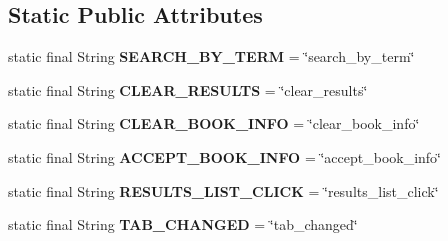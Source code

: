 \subsection*{Static Public Attributes}
\begin{DoxyCompactItemize}
\item 
\hypertarget{classw3se_1_1_controller_1_1_book_search_controller_aead80d147151577ca35c9c324ebc4f62}{static final String {\bfseries S\-E\-A\-R\-C\-H\-\_\-\-B\-Y\-\_\-\-T\-E\-R\-M} = \char`\"{}search\-\_\-by\-\_\-term\char`\"{}}\label{classw3se_1_1_controller_1_1_book_search_controller_aead80d147151577ca35c9c324ebc4f62}

\item 
\hypertarget{classw3se_1_1_controller_1_1_book_search_controller_ad733c56a761184e620fdc2319d13ff85}{static final String {\bfseries C\-L\-E\-A\-R\-\_\-\-R\-E\-S\-U\-L\-T\-S} = \char`\"{}clear\-\_\-results\char`\"{}}\label{classw3se_1_1_controller_1_1_book_search_controller_ad733c56a761184e620fdc2319d13ff85}

\item 
\hypertarget{classw3se_1_1_controller_1_1_book_search_controller_a2bbbe8dbe91f5a94e05d386c3107c351}{static final String {\bfseries C\-L\-E\-A\-R\-\_\-\-B\-O\-O\-K\-\_\-\-I\-N\-F\-O} = \char`\"{}clear\-\_\-book\-\_\-info\char`\"{}}\label{classw3se_1_1_controller_1_1_book_search_controller_a2bbbe8dbe91f5a94e05d386c3107c351}

\item 
\hypertarget{classw3se_1_1_controller_1_1_book_search_controller_a5c665e3dcbba15e9afe04105451d5259}{static final String {\bfseries A\-C\-C\-E\-P\-T\-\_\-\-B\-O\-O\-K\-\_\-\-I\-N\-F\-O} = \char`\"{}accept\-\_\-book\-\_\-info\char`\"{}}\label{classw3se_1_1_controller_1_1_book_search_controller_a5c665e3dcbba15e9afe04105451d5259}

\item 
\hypertarget{classw3se_1_1_controller_1_1_book_search_controller_a29071e248287bcdbea66610ab1398d3a}{static final String {\bfseries R\-E\-S\-U\-L\-T\-S\-\_\-\-L\-I\-S\-T\-\_\-\-C\-L\-I\-C\-K} = \char`\"{}results\-\_\-list\-\_\-click\char`\"{}}\label{classw3se_1_1_controller_1_1_book_search_controller_a29071e248287bcdbea66610ab1398d3a}

\item 
\hypertarget{classw3se_1_1_controller_1_1_book_search_controller_a3be6a70a168a3b50b85e32b07c6c63a3}{static final String {\bfseries T\-A\-B\-\_\-\-C\-H\-A\-N\-G\-E\-D} = \char`\"{}tab\-\_\-changed\char`\"{}}\label{classw3se_1_1_controller_1_1_book_search_controller_a3be6a70a168a3b50b85e32b07c6c63a3}


\end{DoxyCompactItemize}

